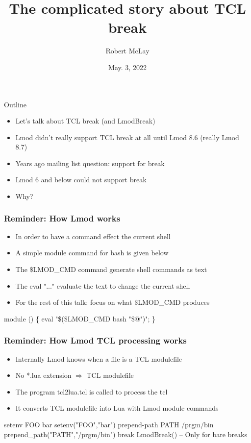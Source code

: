 \documentclass{beamer}
\begin{document}
\title[Lmod]{The complicated story about TCL break}
\author{Robert McLay} 
\date{May. 3, 2022}

\frame{\titlepage} 


\begin{frame}{Outline}
  \begin{itemize}
    \item Let's talk about TCL break (and LmodBreak)
    \item Lmod didn't really support TCL break at all until Lmod 8.6
      (really Lmod 8.7)
    \item Years ago mailing list question: support for break
    \item Lmod 6 and below could not support break
    \item Why?
  \end{itemize}
\end{frame}

\begin{frame}[fragile]
    \frametitle{Reminder: How Lmod works}
  \begin{itemize}
    \item In order to have a command effect the current shell
    \item A simple module command for bash is given below
    \item The \$LMOD\_CMD command generate shell commands as text
    \item The eval "..." evaluate the text to change the current shell
    \item For the rest of this talk: focus on what \$LMOD\_CMD produces
  \end{itemize}
 {\small
    \begin{semiverbatim}
     module () \{ eval "\$(\$LMOD\_CMD bash "\$@")"; \}
    \end{semiverbatim}
}
\end{frame}

\begin{frame}[fragile]
    \frametitle{Reminder: How Lmod TCL processing works}
  \begin{itemize}
    \item Internally Lmod knows when a file is a TCL modulefile 
    \item No *.lua extension $\Rightarrow$ TCL modulefile 
    \item The program tcl2lua.tcl is called to process the tcl 
    \item It converts TCL modulefile into Lua with Lmod module
      commands
  \end{itemize}
 {\tiny
    \begin{semiverbatim}
setenv FOO bar \Rightarrow setenv("FOO","bar")
prepend-path PATH /prgm/bin \Rightarrow prepend_path("PATH","/prgm/bin")
break \Rightarrow LmodBreak() -- Only for bare breaks
    \end{semiverbatim}
}
\end{frame}
\end{document}
